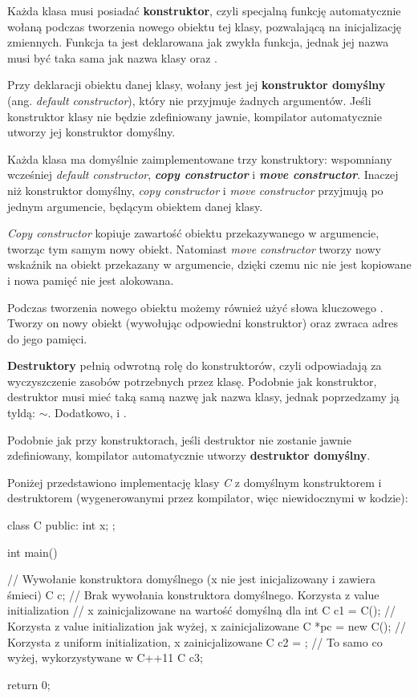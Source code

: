 Każda klasa musi posiadać \textbf{konstruktor}, czyli specjalną funkcję automatycznie wołaną podczas tworzenia nowego obiektu tej klasy, pozwalającą na inicjalizację zmiennych. Funkcja ta jest deklarowana jak zwykła funkcja, jednak jej nazwa musi być taka sama jak nazwa klasy oraz .

Przy deklaracji obiektu danej klasy, wołany jest jej \textbf{konstruktor domyślny} (ang. \textit{default constructor}), który nie przyjmuje żadnych argumentów. Jeśli konstruktor klasy nie będzie zdefiniowany jawnie, kompilator automatycznie utworzy jej konstruktor domyślny.

Każda klasa ma domyślnie zaimplementowane trzy konstruktory: wspomniany wcześniej \textit{default constructor}, \textbf{\textit{copy constructor}} i \textbf{\textit{move constructor}}. Inaczej niż konstruktor domyślny, \textit{copy constructor} i \textit{move constructor} przyjmują po jednym argumencie, będącym obiektem danej klasy. 

\textit{Copy constructor} kopiuje zawartość obiektu przekazywanego w argumencie, tworząc tym samym nowy obiekt. Natomiast \textit{move constructor} tworzy nowy wskaźnik na obiekt przekazany w argumencie, dzięki czemu nic nie jest kopiowane i nowa pamięć nie jest alokowana.

Podczas tworzenia nowego obiektu możemy również użyć słowa kluczowego . Tworzy on nowy obiekt (wywołując odpowiedni konstruktor) oraz zwraca adres do jego pamięci.
\bigskip

\textbf{Destruktory} pełnią odwrotną rolę do konstruktorów, czyli odpowiadają za wyczyszczenie zasobów potrzebnych przez klasę. Podobnie jak konstruktor, destruktor musi mieć taką samą nazwę jak nazwa klasy, jednak poprzedzamy ją tyldą: $\sim$. Dodatkowo,  i .

Podobnie jak przy konstruktorach, jeśli destruktor nie zostanie jawnie zdefiniowany, kompilator automatycznie utworzy \textbf{destruktor domyślny}.

\begin{example}
    Poniżej przedstawiono implementację klasy \textit{C} z domyślnym konstruktorem i destruktorem (wygenerowanymi przez kompilator, więc niewidocznymi w kodzie):

    \begin{cpp}
    class C { 
    public:
      int x;
    };
    
    int main() {
      // Wywołanie konstruktora domyślnego (x nie jest inicjalizowany i zawiera śmieci)
      C c;
      // Brak wywołania konstruktora domyślnego. Korzysta z value initialization
      // x zainicjalizowane na wartość domyślną dla int
      C c1 = C();
      // Korzysta z value initialization jak wyżej, x zainicjalizowane
      C *pc = new C();
      // Korzysta z uniform initialization, x zainicjalizowane
      C c2 = {};
      // To samo co wyżej, wykorzystywane w C++11
      C c3{};
      
      return 0;
    }
    \end{cpp}
\end{example}

